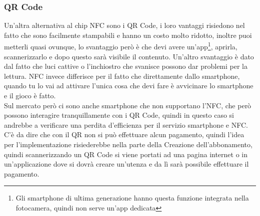 \subsubsection{QR Code}
\hspace{\parindent}Un'altra alternativa al chip NFC sono i QR Code, i loro vantaggi risiedono nel fatto che sono facilmente stampabili e hanno un costo molto ridotto, inoltre puoi metterli quasi ovunque, lo svantaggio però è che devi avere un'app\footnote{Gli smartphone di ultima generazione hanno questa funzione integrata nella fotocamera, quindi non serve un'app dedicata }, aprirla, scannerizzarlo e dopo questo sarà visibile il contenuto. Un'altro svantaggio è dato dal fatto che luci cattive o l'inchiostro che svanisce possono dar problemi per la lettura. NFC invece differisce per il fatto che direttamente dallo smartphone, quando tu lo vai ad attivare l'unica cosa che devi fare è avvicinare lo smartphone e il gioco è fatto.
\\Sul mercato però ci sono anche smartphone che non supportano l'NFC, che però possono interagire tranquillamente con i QR Code, quindi in questo caso si andrebbe a verificare una perdita d'efficienza per il servizio smartphone e NFC. C'è da dire che con il QR non si può effettuare alcun pagamento, quindi l'idea per l'implementazione risiederebbe nella parte della Creazione dell'abbonamento, quindi scannerizzando un QR Code si viene portati ad una pagina internet o in un'applicazione dove si dovrà creare un'utenza e da lì sarà possibile effettuare il pagamento.


